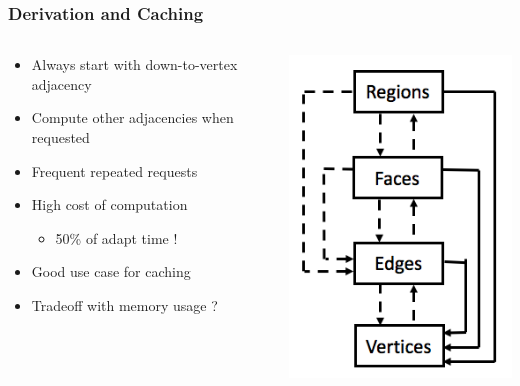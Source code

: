 \documentclass{beamer}
\begin{document}
\begin{frame}
\frametitle{Derivation and Caching}
\begin{columns}[T]
\begin{column}{.5\textwidth}
\begin{itemize}
\item Always start with down-to-vertex adjacency
\item Compute other adjacencies when requested
\item Frequent repeated requests
\item High cost of computation
\begin{itemize}
\item 50\% of adapt time !
\end{itemize}
\item Good use case for caching
\item Tradeoff with memory usage ?
\end{itemize}
\end{column}
\begin{column}{.5\textwidth}
\includegraphics[width=.8\textwidth]{adjs.png}
\end{column}
\end{columns}
\end{frame}
\end{document}
